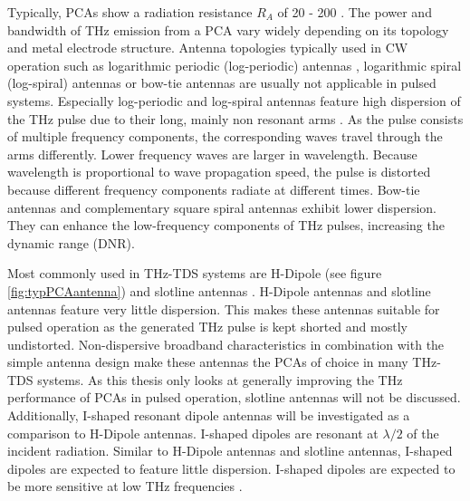 Typically, PCAs show a radiation resistance $R_A$ of \num{20} - \num{200} \si{\Omega}. The power and bandwidth of THz emission from a PCA vary widely depending on its topology and metal electrode structure. Antenna topologies typically used in CW operation such as logarithmic periodic (log-periodic) antennas \cite{mendisTunableCWTHzSystem2004}, logarithmic spiral (log-spiral) \cite{linRoomtemperatureContinuouswaveTerahertz2025} antennas or bow-tie antennas \cite{PDFBowtieWideband} are usually not applicable in pulsed systems. Especially log-periodic and log-spiral antennas feature high dispersion of the THz pulse due to their long, mainly non resonant arms \cite{fernandezolveraDispersivePropertiesSelfcomplementary2017a}. As the pulse consists of multiple frequency components, the corresponding waves travel through the arms differently. Lower frequency waves are larger in wavelength. Because wavelength is proportional to wave propagation speed, the pulse is distorted because different frequency components radiate at different times. Bow-tie antennas and complementary square spiral antennas \cite{HighPowerGeneration} exhibit lower dispersion. They can enhance the low-frequency components of THz pulses, increasing the dynamic range (DNR). 

Most commonly used in THz-TDS systems are H-Dipole \cite{nandi1550nmDrivenErAs2018} (see figure \ref{fig:typPCAantenna}) and slotline antennas \cite{kohlhaasPhotoconductiveTerahertzDetectors2019}. H-Dipole antennas and slotline antennas feature very little dispersion. This makes these antennas suitable for pulsed operation as the generated THz pulse is kept shorted and mostly undistorted. Non-dispersive broadband characteristics in combination with the simple antenna design make these antennas the PCAs of choice in many THz-TDS systems. As this thesis only looks at generally improving the THz performance of PCAs in pulsed operation, slotline antennas will not be discussed. Additionally, I-shaped resonant dipole antennas will be investigated as a comparison to H-Dipole antennas. I-shaped dipoles are resonant at $\lambda/2$ of the incident radiation. Similar to H-Dipole antennas and slotline antennas, I-shaped dipoles are expected to feature little dispersion. I-shaped dipoles are expected to be more sensitive at low THz frequencies \cite{nguyenPhotoconductiveDipoleAntennas2017}. 